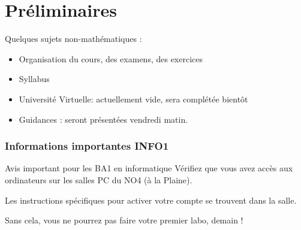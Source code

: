 \section{Préliminaires}
\begin{frame}
  \maketitle
\end{frame}
\begin{frame}
  Quelques sujets non-mathématiques :
  \begin{itemize}
  \item Organisation du cours, des examens, des exercices
  \item Syllabus
  \item Université Virtuelle\pause : actuellement vide, sera complétée bientôt\pause
  \item Guidances \pause : seront présentées vendredi matin.
  \end{itemize}
\end{frame}
\begin{frame}
  \frametitle{Informations importantes INFO1}
  \begin{block}{Avis important pour les BA1 en informatique}
    Vérifiez que vous avez accès aux ordinateurs sur les salles PC du NO4 (à la Plaine).

    Les instructions spécifiques pour activer votre compte se trouvent dans la salle.

    Sans cela, vous ne pourrez pas faire votre premier labo, demain !
  \end{block}

\end{frame}
